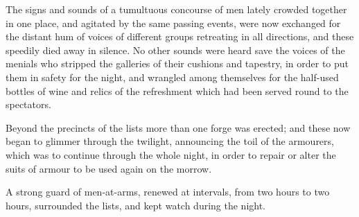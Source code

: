 The signs and sounds of a tumultuous concourse of men lately crowded
together in one place, and agitated by the same passing events, were now
exchanged for the distant hum of voices of different groups retreating
in all directions, and these speedily died away in silence. No other
sounds were heard save the voices of the menials who stripped the
galleries of their cushions and tapestry, in order to put them in safety
for the night, and wrangled among themselves for the half-used bottles
of wine and relics of the refreshment which had been served round to the
spectators.

Beyond the precincts of the lists more than one forge was erected; and
these now began to glimmer through the twilight, announcing the toil of
the armourers, which was to continue through the whole night, in order
to repair or alter the suits of armour to be used again on the morrow.

A strong guard of men-at-arms, renewed at intervals, from two hours to
two hours, surrounded the lists, and kept watch during the night.
